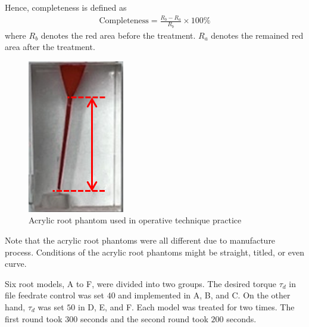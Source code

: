 \par
Hence, completeness is defined as 
\begin{equation}
\begin{split}
	\text{Completeness} = \frac{R_b - R_a}{R_b} \times 100\%
\end{split}
\end{equation}
where $R_b$ denotes the red area before the treatment. $R_a$ denotes the remained red area after the treatment.
\begin{figure}[htbp]
\begin{center}
\includegraphics[width=0.15\linewidth]{Images/root_single.png}
\caption{Acrylic root phantom used in operative technique practice}
\label{fig: root_single}
\end{center}
\end{figure}
\par
Note that the acrylic root phantoms were all different due to manufacture process. Conditions of the acrylic root phantoms might be straight, titled, or even curve. 
\par
Six root models, A to F, were divided into two groups. The desired torque $\tau_d$ in file feedrate control was set $40$ and implemented in A, B, and C. On the other hand, $\tau_d$ was set $50$ in D, E, and F. Each model was treated for two times. The first round took $300$ seconds and the second round took $200$ seconds.
